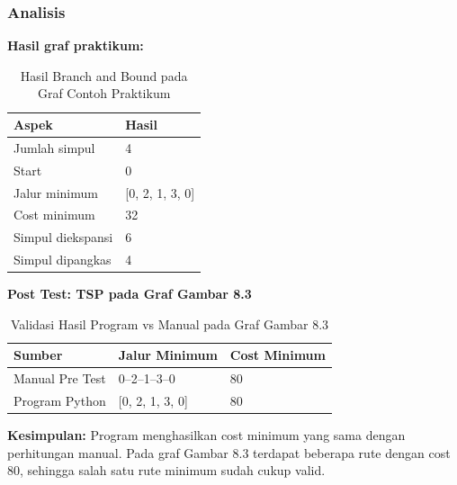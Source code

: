 \subsubsection*{Analisis}
\textbf{Hasil graf praktikum:}
\begin{table}[H]
    \centering
    \caption{Hasil Branch and Bound pada Graf Contoh Praktikum}
    \label{tab:praktikum8-hasil-praktikum}
    \begin{tabular}{ll}
    \toprule
    \textbf{Aspek} & \textbf{Hasil} \\ \midrule
    Jumlah simpul & 4 \\
    Start & 0 \\
    Jalur minimum & [0, 2, 1, 3, 0] \\
    Cost minimum & 32 \\
    Simpul diekspansi & 6 \\
    Simpul dipangkas & 4 \\ \bottomrule
    \end{tabular}
\end{table}

\textbf{Post Test: TSP pada Graf Gambar 8.3}
\begin{table}[H]
    \centering
    \caption{Validasi Hasil Program vs Manual pada Graf Gambar 8.3}
    \label{tab:praktikum8-validasi-posttest}
    \begin{tabular}{lll}
    \toprule
    \textbf{Sumber} & \textbf{Jalur Minimum} & \textbf{Cost Minimum} \\ \midrule
    Manual Pre Test & 0--2--1--3--0 & 80 \\
    Program Python & [0, 2, 1, 3, 0] & 80 \\ \bottomrule
    \end{tabular}
\end{table}

\textbf{Kesimpulan:} Program menghasilkan cost minimum yang sama dengan perhitungan manual. Pada graf Gambar 8.3 terdapat beberapa rute dengan cost 80, sehingga salah satu rute minimum sudah cukup valid.
